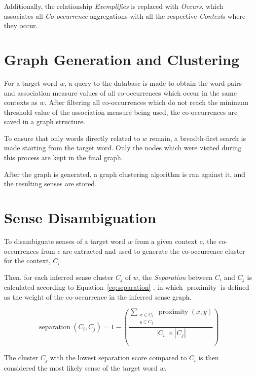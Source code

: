 Additionally, the relationship \emph{Exemplifies} is replaced with
\emph{Occurs}, which associates all \emph{Co-occurrence} aggregations with all
the respective \emph{Context}s where they occur.

\section{Graph Generation and Clustering}

For a target word $w$, a query to the database is made to obtain the word pairs 
and association measure values of all co-occurrences which occur in the same 
contexts as $w$. After filtering all co-occurrences which do not reach the 
minimum threshold value of the association measure being used, the 
co-occurrences are saved in a graph structure.

To ensure that only words directly related to $w$ remain, a breadth-first 
search is made starting from the target word. Only the nodes which were visited 
during this process are kept in the final graph.

After the graph is generated, a graph clustering algorithm is ran against it,
and the resulting senses are stored.

\section{Sense Disambiguation}

To disambiguate senses of a target word $w$ from a given context
$c$, the co-occurrences from $c$ are extracted and used to generate
the co-occurrence cluster for the context, $C_i$.

Then, for each inferred sense cluster $C_j$ of $w$, the
\emph{Separation} between $C_i$ and $C_j$ is calculated according to
Equation~\ref{eq:separation} \citep{hope2013uos}, in which
$\operatorname{proximity}$ is defined as the weight of the co-occurrence in the
inferred sense graph.

\begin{equation}
 \operatorname{separation}(C_i,C_j) =
 1 - \left(
 \frac {\sum_{\substack{x \in C_i \\ y \in C_j}} \operatorname{proximity}(x,y)}
       {|C_i| \times |C_j|}
 \right)
\label{eq:separation}
\end{equation}

The cluster $C_j$ with the lowest separation score compared to $C_i$ is then
considered the most likely sense of the target word $w$.


